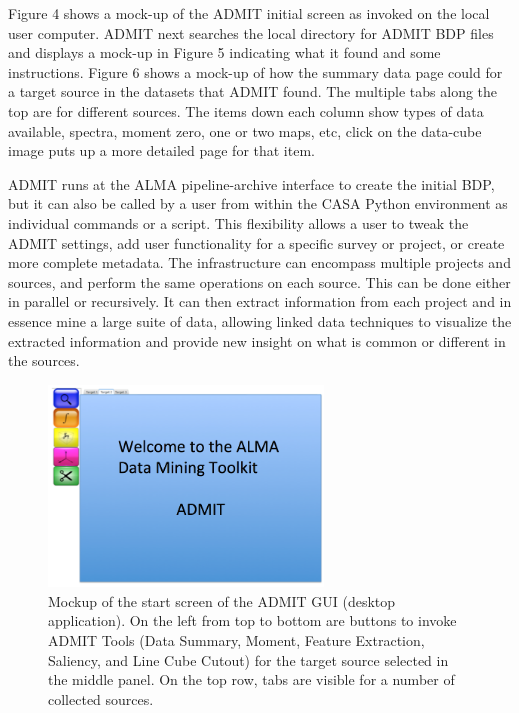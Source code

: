 Figure 4 shows a mock-up of the ADMIT initial screen as invoked on the
local user computer. ADMIT next searches the local directory for ADMIT
BDP files and displays a mock-up in Figure 5 indicating what it found and
some instructions. Figure 6 shows a mock-up of how the summary data page
could for a target source in the datasets that ADMIT found. The multiple
tabs along the top are for different sources. The items down each column
show types of data available, spectra, moment zero,
one or two maps, etc, click on the data-cube image puts up a more detailed
page for that item.

ADMIT runs at the ALMA pipeline-archive interface to create the initial BDP, 
but it can also be called by a user from within 
the CASA Python environment as individual commands or a script. This flexibility 
allows a user to tweak the ADMIT settings, add user functionality for a 
specific survey or project, or create more complete metadata.  
The infrastructure can encompass multiple projects and sources, and perform the 
same operations on each source. This can be done either in parallel or recursively. 
It can then extract information from each project and in essence mine a large 
suite of data, allowing linked data techniques to visualize the extracted 
information and provide new insight on what is common or different in the sources.

\begin{figure}[h]
\centering
\includegraphics[width=0.65\textwidth]{welcome.png}
\hspace{0.03in}
\caption{\small \setlength{\baselineskip}{0.85\baselineskip}
Mockup of the start screen of the ADMIT GUI (desktop application).
On the left from top to bottom are buttons to invoke ADMIT Tools
(Data Summary, Moment, Feature Extraction, Saliency, and Line Cube Cutout)
for the target source selected in the middle panel. On the top row, tabs
are visible for a number of collected sources.
  }
\label{fig:layout}
\end{figure}

